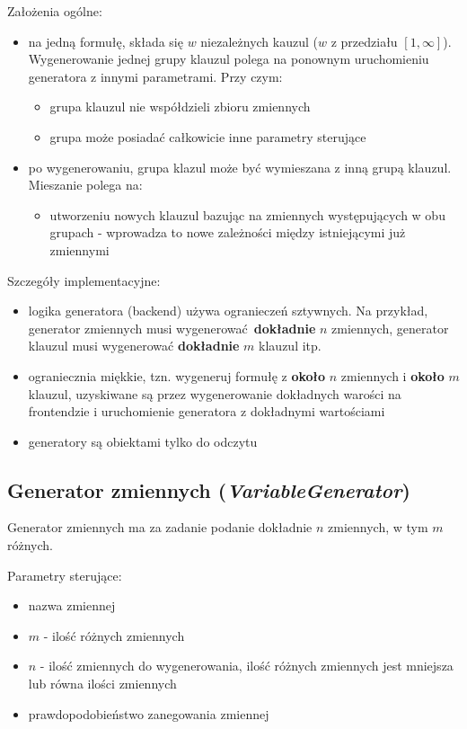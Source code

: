 \documentclass[a4paper,12pt]{article}
\begin{document}
\noindent
Założenia ogólne:
\begin{itemize}
  \item na jedną formułę, składa się $w$ niezależnych kauzul ($w$ z przedziału $[1, \infty]$). Wygenerowanie jednej grupy klauzul polega na ponownym uruchomieniu generatora z innymi parametrami. Przy czym:
    \begin{itemize}
      \item grupa klauzul nie współdzieli zbioru zmiennych
      \item grupa może posiadać całkowicie inne parametry sterujące
    \end{itemize}
  \item po wygenerowaniu, grupa klazul może być wymieszana z inną grupą klauzul. Mieszanie polega na:
    \begin{itemize}
      \item utworzeniu nowych klauzul bazując na zmiennych występujących w obu grupach - wprowadza to nowe zależności między istniejącymi już zmiennymi
    \end{itemize}
\end{itemize}

\noindent
Szczegóły implementacyjne:
\begin{itemize}
  \item logika generatora (backend) używa ogranieczeń sztywnych. Na przykład, generator zmiennych musi wygenerować \textbf{dokładnie} $n$ zmiennych, generator klauzul musi wygenerować \textbf{dokładnie} $m$ klauzul itp.
  \item ograniecznia miękkie, tzn. wygeneruj formułę z \textbf{około} $n$ zmiennych i \textbf{około} $m$ klauzul, uzyskiwane są przez wygenerowanie dokładnych warości na frontendzie i uruchomienie generatora z dokładnymi wartościami
  \item generatory są obiektami tylko do odczytu
\end{itemize}

\subsection{Generator zmiennych (\textit{VariableGenerator})}

Generator zmiennych ma za zadanie podanie dokładnie $n$ zmiennych, w tym $m$ różnych.

\noindent
Parametry sterujące:

\begin{itemize}
  \item nazwa zmiennej
  \item $m$ - ilość różnych zmiennych
  \item $n$ - ilość zmiennych do wygenerowania, ilość różnych zmiennych jest mniejsza lub równa ilości zmiennych
  \item prawdopodobieństwo zanegowania zmiennej
\end{itemize}
\end{document}
